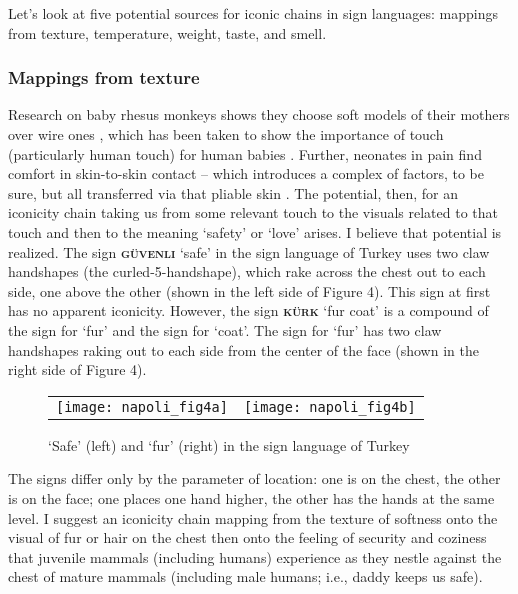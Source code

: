\documentclass[output=paper,
modfonts
]{LSP/langsci}
\begin{document}
Let's look at five potential sources for iconic chains in sign
languages: mappings from texture, temperature, weight, taste, and smell.

\subsubsection{Mappings from texture} Research on baby rhesus monkeys shows they
choose soft models of their mothers over wire ones \citep{harlow1959}, which
has been taken to show the importance of touch (particularly human
touch) for human babies \citep{lynch1970,schneider1996}. Further, neonates
in pain find comfort in skin-to-skin contact -- which introduces a
complex of factors, to be sure, but all transferred via that pliable
skin \citep{kostandy2008}. The potential, then, for an iconicity chain taking
us from some relevant touch to the visuals related to that touch and
then to the meaning `safety' or `love' arises. I believe that potential
is realized. The sign \textbf{\textsc{güvenli}} `safe' in the sign
language of Turkey uses two claw handshapes (the curled-5-handshape),
which rake across the chest out to each side, one above the other (shown
in the left side of Figure 4). This sign at first has no apparent
iconicity. However, the sign \textbf{\textsc{kürk}} `fur coat' is a
compound of the sign for `fur' and the sign for `coat'. The sign for
`fur' has two claw handshapes raking out to each side from the center of
the face (shown in the right side of Figure 4).

\begin{figure}
	\begin{tabularx}{\textwidth}{CC}
	\texttt{[image: napoli\_fig4a]} & \texttt{[image: napoli\_fig4b]}\\
	\end{tabularx}
\centering\caption{ `Safe' (left) and `fur' (right) in the sign language of
Turkey}
\label{fig:4n}
\end{figure}

The signs differ only by the parameter of location: one is on the chest,
the other is on the face; one places one hand higher, the other has the hands
at the same level. I suggest an iconicity chain mapping from the
texture of softness onto the visual of fur or hair on the chest then
onto the feeling of security and coziness that juvenile mammals
(including humans) experience as they nestle against the chest of mature
mammals (including male humans; i.e., daddy keeps us safe).
\end{document}

